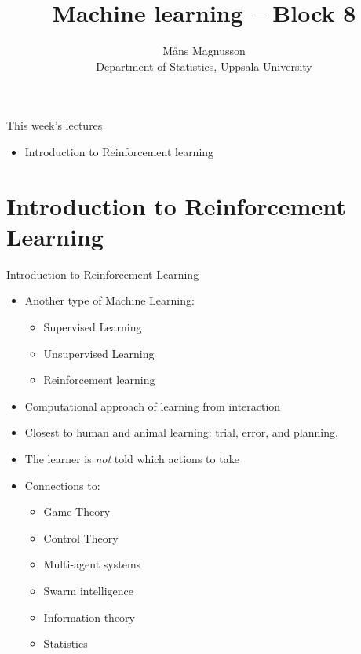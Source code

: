 \documentclass[10pt]{beamer}
\title[]{{\color{black}Machine learning -- Block 8}}
\author[]{M{\aa}ns Magnusson\\Department of Statistics, Uppsala University}
\date{\currentsemester}
\begin{document}
\frame{\titlepage
}



\begin{frame}{This week's lectures}
\begin{itemize}
\item Introduction to Reinforcement learning
\end{itemize}
\end{frame}



\section{Introduction to Reinforcement Learning}

\begin{frame}{Introduction to Reinforcement Learning}

\begin{itemize}
\item Another type of Machine Learning:
\begin{itemize}
\item Supervised Learning
\item Unsupervised Learning
\item {\color{uured} Reinforcement learning}
\end{itemize}
\pause
\item Computational approach of {\color{uured} learning from interaction}
\item Closest to human and animal learning: {\color{uured} trial, error, and planning.}
\item The learner is \emph{not} told which actions to take
\pause
\item Connections to:
\begin{itemize}
\item Game Theory
\item Control Theory
\item Multi-agent systems
\item Swarm intelligence
\item Information theory
\item Statistics
\end{itemize}
\end{itemize}

\end{frame}
\end{document}
